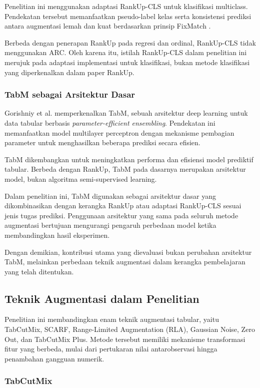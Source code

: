 Penelitian ini menggunakan adaptasi RankUp-CLS untuk klasifikasi multiclass. Pendekatan tersebut memanfaatkan pseudo-label kelas serta konsistensi prediksi antara augmentasi lemah dan kuat berdasarkan prinsip FixMatch \cite{ref9}.

Berbeda dengan penerapan RankUp pada regresi dan ordinal, RankUp-CLS tidak menggunakan ARC. Oleh karena itu, istilah RankUp-CLS dalam penelitian ini merujuk pada adaptasi implementasi untuk klasifikasi, bukan metode klasifikasi yang diperkenalkan dalam paper RankUp.

\subsubsection{TabM sebagai Arsitektur Dasar}

Gorishniy et al. \cite{ref11} memperkenalkan TabM, sebuah arsitektur deep learning untuk data tabular berbasis \textit{parameter-efficient ensembling}. Pendekatan ini memanfaatkan model multilayer perceptron dengan mekanisme pembagian parameter untuk menghasilkan beberapa prediksi secara efisien.

TabM dikembangkan untuk meningkatkan performa dan efisiensi model prediktif tabular. Berbeda dengan RankUp, TabM pada dasarnya merupakan arsitektur model, bukan algoritma semi-supervised learning.

Dalam penelitian ini, TabM digunakan sebagai arsitektur dasar yang dikombinasikan dengan kerangka RankUp atau adaptasi RankUp-CLS sesuai jenis tugas prediksi. Penggunaan arsitektur yang sama pada seluruh metode augmentasi bertujuan mengurangi pengaruh perbedaan model ketika membandingkan hasil eksperimen.

Dengan demikian, kontribusi utama yang dievaluasi bukan perubahan arsitektur TabM, melainkan perbedaan teknik augmentasi dalam kerangka pembelajaran yang telah ditentukan.

\subsection{Teknik Augmentasi dalam Penelitian}

Penelitian ini membandingkan enam teknik augmentasi tabular, yaitu TabCutMix, SCARF, Range-Limited Augmentation (RLA), Gaussian Noise, Zero Out, dan TabCutMix Plus. Metode tersebut memiliki mekanisme transformasi fitur yang berbeda, mulai dari pertukaran nilai antarobservasi hingga penambahan gangguan numerik.

\subsubsection{TabCutMix}

